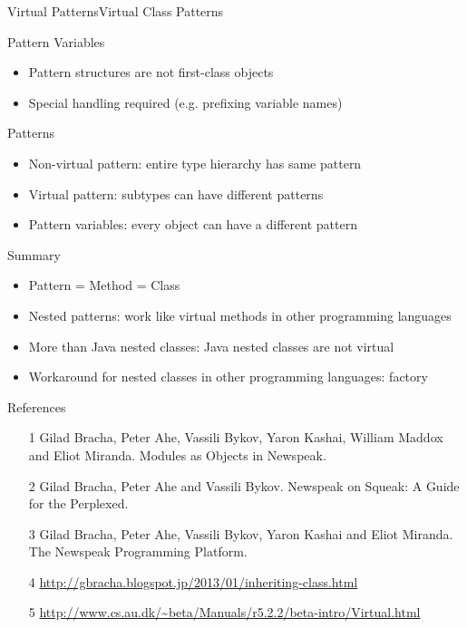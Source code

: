 \documentclass[xcolor=dvipsname,handout]{beamer} %
\begin{document}
\begin{frame}[fragile]{Virtual Patterns}{Virtual Class Patterns}

\end{frame}

\begin{frame}{Pattern Variables}
  \begin{itemize}
    \item Pattern structures are not first-class objects
    \item Special handling required (e.g. prefixing variable names)
  \end{itemize}
\end{frame}

\begin{frame}{Patterns}
  \begin{itemize}
    \item Non-virtual pattern: entire type hierarchy has same pattern
    \item Virtual pattern: subtypes can have different patterns
    \item Pattern variables: every object can have a different pattern
  \end{itemize}
\end{frame}

\begin{frame}{Summary}
\begin{itemize}
  \item Pattern = Method = Class
  \item Nested patterns: work like virtual methods in other programming languages
  \item More than Java nested classes: Java nested classes are not virtual
  \item Workaround for nested classes in other programming languages: factory
\end{itemize}
\end{frame}

\begin{frame}{References}
\begin{itemize}
  \item [1] Gilad Bracha, Peter Ahe, Vassili Bykov, Yaron Kashai, William Maddox and Eliot Miranda. Modules as Objects in Newspeak.
  \item [2] Gilad Bracha, Peter Ahe and Vassili Bykov. Newspeak on Squeak: A Guide for the Perplexed.
  \item [3] Gilad Bracha, Peter Ahe, Vassili Bykov, Yaron Kashai and Eliot Miranda. The Newspeak Programming Platform. 
  \item [4] \url{http://gbracha.blogspot.jp/2013/01/inheriting-class.html}
  \item [5] \url{http://www.cs.au.dk/~beta/Manuals/r5.2.2/beta-intro/Virtual.html}
\end{itemize}
\end{frame}
\end{document}
